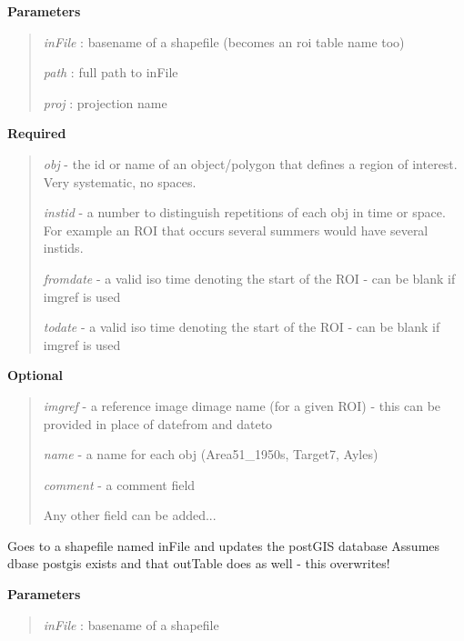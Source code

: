 \documentclass[letterpaper,10pt,english]{sphinxmanual}
\begin{document}
\begin{fulllineitems}
\begin{fulllineitems}
\textbf{Parameters}
\begin{quote}

\emph{inFile}   : basename of a shapefile (becomes an roi table name too)

\emph{path}     : full path to inFile

\emph{proj}     : projection name
\end{quote}

\textbf{Required}
\begin{quote}

\emph{obj}      - the id or name of an object/polygon that defines a region of interest. Very systematic, no spaces.

\emph{instid}   - a number to distinguish repetitions of each obj in time or space.  For example an ROI that occurs several summers would have several instids.

\emph{fromdate} - a valid iso time denoting the start of the ROI - can be blank if imgref is used

\emph{todate}   - a valid iso time denoting the start of the ROI - can be blank if imgref is used
\end{quote}

\textbf{Optional}
\begin{quote}

\emph{imgref}   - a reference image dimage name (for a given ROI) - this can be provided in place of datefrom and dateto

\emph{name}     - a name for each obj (Area51\_1950s, Target7, Ayles)

\emph{comment}  - a comment field

Any other field can be added...
\end{quote}

\end{fulllineitems}


\begin{fulllineitems}
\label{code:Database.Database.update_NTAI_FLUX_ROI}
Goes to a shapefile named inFile and updates the postGIS database
Assumes dbase postgis exists and that outTable does as well - this overwrites!

\textbf{Parameters}
\begin{quote}

\emph{inFile} : basename of a shapefile


\end{quote}
\end{fulllineitems}
\end{fulllineitems}
\end{document}
